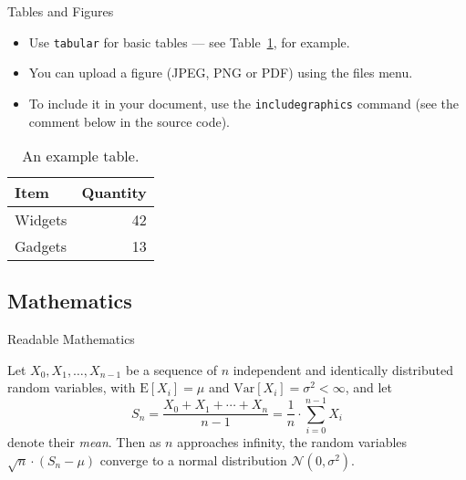 \documentclass[
	hyperref={unicode},	%
	url={hyphens},
	english
	]{beamer}
\begin{document}
\begin{frame}{Tables and Figures}

\begin{itemize}
\item Use \texttt{tabular} for basic tables --- see Table~\ref{tab:widgets}, for example.
\item You can upload a figure (JPEG, PNG or PDF) using the files menu. 
\item To include it in your document, use the \texttt{includegraphics} command (see the comment below in the source code).
\end{itemize}


\begin{table}
\centering
\begin{tabular}{l|r}
Item & Quantity \\\hline
Widgets & 42 \\
Gadgets & 13
\end{tabular}
\caption{\label{tab:widgets}An example table.}
\end{table}

\end{frame}

\subsection{Mathematics}

\begin{frame}{Readable Mathematics}

Let $X_0, X_1, \ldots, X_{n-1}$ be a sequence of $n$ independent and identically distributed random variables, with $\mathrm{E}[X_i] = \mu$ and $\mathrm{Var}[X_i] = \sigma^2 < \infty$, and let
\begin{equation}
S_n = \frac{X_0 + X_1 + \cdots + X_n}{n-1}
      = \frac{1}{n} \cdot\sum_{i=0}^{n-1} X_i
\label{eq:Mean}
\end{equation}
denote their \emph{mean}. Then as $n$ approaches infinity, the random variables $\sqrt{n} \cdot(S_n - \mu)$ converge 
to a normal distribution $\mathcal{N}(0, \sigma^2)$.

\end{frame}
\end{document}
